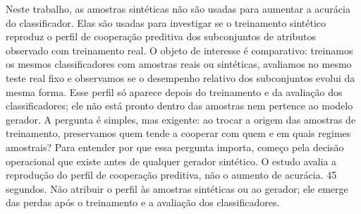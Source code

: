 \begin{frame}
  \vspace{0.30cm}

  \speakernotes
    {Neste trabalho, as amostras sintéticas não são usadas para aumentar a acurácia do classificador. Elas são usadas para investigar se o treinamento sintético reproduz o perfil de cooperação preditiva dos subconjuntos de atributos observado com treinamento real. O objeto de interesse é comparativo: treinamos os mesmos classificadores com amostras reais ou sintéticas, avaliamos no mesmo teste real fixo e observamos se o desempenho relativo dos subconjuntos evolui da mesma forma. Esse perfil só aparece depois do treinamento e da avaliação dos classificadores; ele não está pronto dentro das amostras nem pertence ao modelo gerador. A pergunta é simples, mas exigente: ao trocar a origem das amostras de treinamento, preservamos quem tende a cooperar com quem e em quais regimes amostrais?}
    {Para entender por que essa pergunta importa, começo pela decisão operacional que existe antes de qualquer gerador sintético.}
    {O estudo avalia a reprodução do perfil de cooperação preditiva, não o aumento de acurácia.}
    {45 segundos.}
    {Não atribuir o perfil às amostras sintéticas ou ao gerador; ele emerge das perdas após o treinamento e a avaliação dos classificadores.}
\end{frame}

